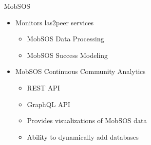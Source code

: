 \begin{frame}{MobSOS}

  \begin{itemize}
    \item Monitors las2peer services \cite{Renz16}
    \begin{itemize}
        \item MobSOS Data Processing
        \item MobSOS Success Modeling
    \end{itemize}
    \item MobSOS Continuous Community Analytics \cite{Kers20} 
          \begin{itemize}
            \item REST API
            \item GraphQL API
            \item Provides visualizations of MobSOS data
            \item Ability to dynamically add databases
          \end{itemize}
  \end{itemize}
\end{frame}



